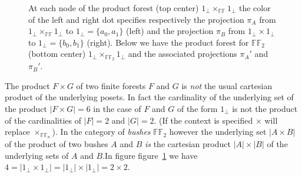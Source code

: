 \begin{figure}[h]
	\caption{At each node of the product forest (top center) $ 1_\bot \times_{\mathbb{FF}} 1_\bot$ the color of the left and right dot specifies respectively the projection $\pi_A$ from $ 1_\bot \times_{\mathbb{FF}} 1_\bot$ to  $1_\bot = \{a_0,a_1\}$ (left) and the projection $\pi_B$ from $ 1_\bot \times 1_\bot$ to $1_\bot = \{b_0,b_1\}$ (right).\newline
		Below we have 
		the product forest for $\mathbb{FF}_2 $ (bottom center) $ 1_\bot \times_{\mathbb{FF}_2} 1_\bot$ and the associated projections $\pi_{A}'$ and $\pi_{B}'$.}
		\label{fig:product}
\end{figure}


The product $ F \times G $ of two finite forests $F$ and $G$ is \emph{not} the usual cartesian product of the underlying posets. \newline
In fact the cardinality of the underlying set of the product $ | F \times G | = 6$ in the case of $F$ and $G$ of the form $1_\bot$ is not the product of the cardinalities of $ | F | = 2 $ and $ | G | = 2 $.  \newline
(If the context is specified $\times$ will replace $\times_{\mathbb{FF}_n}$). \newline
In the category of \emph{bushes} $\mathbb{FF}_2$ however the underlying set $ | A \times B | $ of the product of two bushes $A$ and $B$ \emph{is} the cartesian product $| A | \times | B | $ of the underlying sets of $A$ and $B$.\newline In figure figure~\ref{fig:product} we have $4 = | 1_\bot \times 1_\bot | = | 1_\bot | \times | 1_\bot | = 2 \times 2 $.

